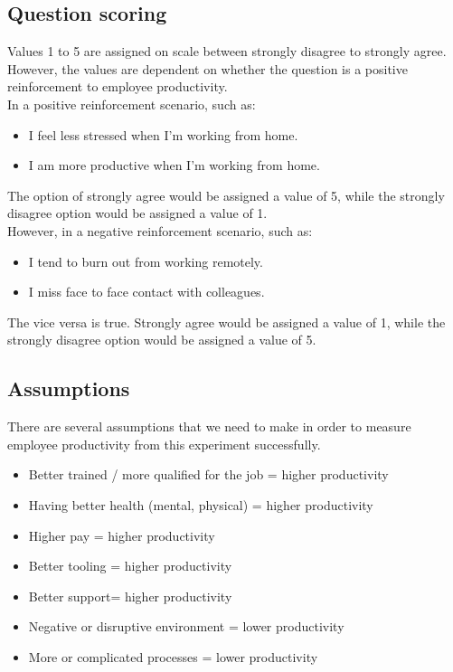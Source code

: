 \documentclass[12pt]{article}
\begin{document}
\subsection*{Question scoring}
Values 1 to 5 are assigned on scale between strongly disagree to strongly agree. However, the values are dependent on whether the question is a positive reinforcement to employee productivity. \\
In a positive reinforcement scenario, such as: 
\begin{itemize}
  \item I feel less stressed when I’m working from home. 
  \item I am more productive when I’m working from home. 
\end{itemize}
The option of strongly agree would be assigned a value of 5, while the strongly disagree option would be assigned a value of 1. \\
However, in a negative reinforcement scenario, such as: 
\begin{itemize}
  \item I tend to burn out from working remotely.
  \item I miss face to face contact with colleagues.
\end{itemize}
The vice versa is true. Strongly agree would be assigned a value of 1, while the strongly disagree option would be assigned a value of 5.

\subsection*{Assumptions}
There are several assumptions that we need to make in order to measure employee productivity from this experiment successfully.

\begin{itemize}
  \item Better trained / more qualified for the job = higher productivity
  \item Having better health (mental, physical) = higher productivity
  \item Higher pay = higher productivity
  \item Better tooling = higher productivity
  \item Better support= higher productivity
  \item Negative or disruptive environment = lower productivity
  \item More or complicated processes = lower productivity
\end{itemize}
\end{document}
